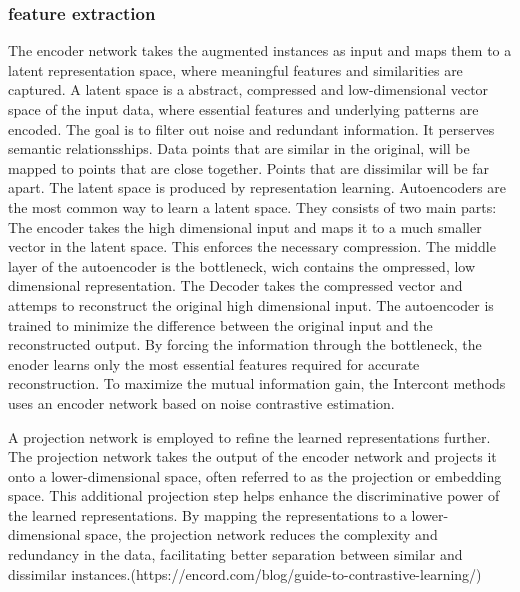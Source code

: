 

\subsubsection{feature extraction}
The encoder network takes the augmented instances as input and maps them to a latent representation space,
where meaningful features and similarities are captured. 
A latent space is a abstract, compressed and low-dimensional vector space of the input data, where essential features and underlying patterns are encoded.
The goal is to filter out noise and redundant information. 
It perserves semantic relationsships. Data points that are similar in the original, will be mapped to points that are close together. 
Points that are dissimilar will be far apart.
The latent space is produced by representation learning. 
Autoencoders are the most common way to learn a latent space. They consists of two main parts:
The encoder takes the high dimensional input and maps it to a much smaller vector in the latent space. This enforces the necessary compression.
The middle layer of the autoencoder is the bottleneck, wich contains the ompressed, low dimensional representation. 
The Decoder takes the compressed vector and attemps to reconstruct the original high dimensional input. 
The autoencoder is trained to minimize the difference between the original input and the reconstructed output. By forcing the information through the bottleneck, the 
enoder learns only the most essential features required for accurate reconstruction.
To maximize the mutual information gain, the Intercont methods uses an encoder network based on noise contrastive estimation. \citep{oord2018representation}


A projection network is employed to refine the learned representations further. 
The projection network takes the output of the encoder network and projects it onto a lower-dimensional space, 
often referred to as the projection or embedding space. 
This additional projection step helps enhance the discriminative power of the learned representations. 
By mapping the representations to a lower-dimensional space, the projection network reduces the complexity and redundancy 
in the data, facilitating better separation between similar and dissimilar instances.(https://encord.com/blog/guide-to-contrastive-learning/)


